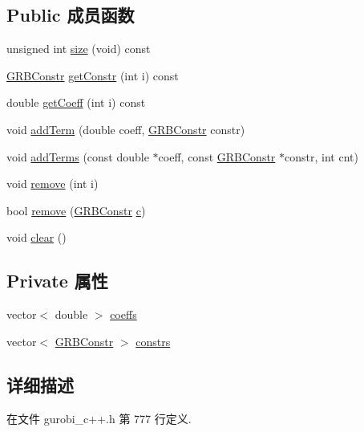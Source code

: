\subsection*{Public 成员函数}
\begin{DoxyCompactItemize}
\item 
unsigned int \hyperlink{classGRBColumn_a6eccdebcb0f2398ea9f4052d02556edb}{size} (void) const 
\item 
\hyperlink{classGRBConstr}{G\+R\+B\+Constr} \hyperlink{classGRBColumn_ace7f5fa402631a190e05d748d4419785}{get\+Constr} (int i) const 
\item 
double \hyperlink{classGRBColumn_ae80d8a00cfd2f8ed08b4b568c4200e92}{get\+Coeff} (int i) const 
\item 
void \hyperlink{classGRBColumn_a362319584df999c5b3c307c753470dca}{add\+Term} (double coeff, \hyperlink{classGRBConstr}{G\+R\+B\+Constr} constr)
\item 
void \hyperlink{classGRBColumn_af09eb19173fed76d7bbb5a5fc3412a1e}{add\+Terms} (const double $\ast$coeff, const \hyperlink{classGRBConstr}{G\+R\+B\+Constr} $\ast$constr, int cnt)
\item 
void \hyperlink{classGRBColumn_a98e7b3e9d0f41ff6735e0a4fcb320524}{remove} (int i)
\item 
bool \hyperlink{classGRBColumn_a144b23ac50865047d13d124194425ab3}{remove} (\hyperlink{classGRBConstr}{G\+R\+B\+Constr} \hyperlink{IntArray2bmp_8h_ae9d8014c37dbf37873bdee6b8497a065}{c})
\item 
void \hyperlink{classGRBColumn_ab85ab11f2a7c07c555e79a28c3d817e5}{clear} ()
\end{DoxyCompactItemize}
\subsection*{Private 属性}
\begin{DoxyCompactItemize}
\item 
vector$<$ double $>$ \hyperlink{classGRBColumn_a566867c00e843b07d5f190207750ade7}{coeffs}
\item 
vector$<$ \hyperlink{classGRBConstr}{G\+R\+B\+Constr} $>$ \hyperlink{classGRBColumn_a301819481446b8cf0b0b106febb678c4}{constrs}
\end{DoxyCompactItemize}


\subsection{详细描述}


在文件 gurobi\+\_\+c++.\+h 第 777 行定义.




